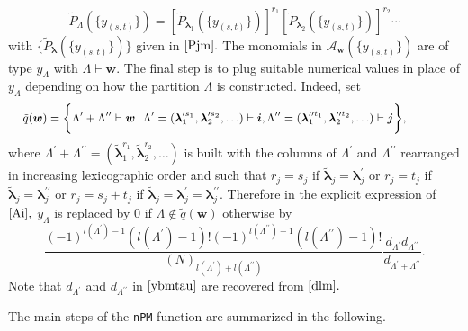 \[\tilde{P}_{\Lambda}\left( \{y_{(s,t)}\} \right)  = [\tilde{P}_{\boldsymbol{\lambda}_1}
\left( \{y_{(s,t)}\} \right) ]^{r_1} [\tilde{P}_{\boldsymbol{\lambda}_2}\left( \{y_{(s,t)}\} \right) ]^{r_2} 
\cdots\]
with \(\{\tilde{P}_{\boldsymbol{\lambda}}\left( \{y_{(s,t)}\} \right)\}\) given in \(\eqref{Pjm}.\)
The monomials in \({\mathcal A}_{\boldsymbol{w}}\left( \{y_{(s,t)}\} \right)\) are of type \(y_{\Lambda}\) with \(\Lambda \vdash \boldsymbol{w}.\) The final step is to plug suitable numerical values in place of \(y_{\Lambda}\) depending on how the partition \(\Lambda\) is constructed. Indeed, set
\begin{equation}\label{qw}
\hskip-1.3cm{\small \tilde{q}(\boldsymbol{w}) = \bigg\{  \Lambda^{\prime}+\Lambda^{\prime \prime} \vdash \boldsymbol{w} \, \big| \, \Lambda^{\prime}=(\boldsymbol{\lambda}_1^{\prime s_1}, \boldsymbol{\lambda}_2^{\prime s_2}, \ldots) \vdash \boldsymbol{i}, \Lambda^{\prime \prime} = (\boldsymbol{\lambda}_1^{\prime \prime t_1}, \boldsymbol{\lambda}_2^{\prime \prime t_2},\ldots) \vdash \boldsymbol{j} \bigg\}},\!\!\!
\end{equation}
where
\(\Lambda^{\prime}+\Lambda^{\prime \prime}=(\tilde{\boldsymbol{\lambda}}_1^{r_1}, \tilde{\boldsymbol{\lambda}}_2^{r_2}, \ldots)\) is built with the columns of
\(\Lambda^{\prime}\) and \(\Lambda^{\prime \prime}\) rearranged in increasing lexicographic order and such that \(r_j=s_j\) if \(\tilde{\boldsymbol{\lambda}}_j = \boldsymbol{\lambda}^{\prime}_j\) or \(r_j=t_j\) if \(\tilde{\boldsymbol{\lambda}}_j = \boldsymbol{\lambda}^{\prime \prime}_j\) or \(r_j=s_j+t_j\) if \(\tilde{\boldsymbol{\lambda}}_j = \boldsymbol{\lambda}^{\prime}_j = \boldsymbol{\lambda}^{\prime \prime}_j.\)
Therefore in the explicit expression of \(\eqref{Ai},\) \(y_{\Lambda}\) is replaced by \(0\) if \(\Lambda \not \in \tilde{q}(\boldsymbol{w})\) otherwise by
\begin{equation}\label{ybmtau}
\frac{{(-1)^{l(\Lambda^{\prime})-1}(l(\Lambda^{\prime})-1)!(-1)^{l(\Lambda^{\prime \prime})-1}(l(\Lambda^{\prime \prime})-1)!}}{(N)_{l(\Lambda^{\prime})+l(\Lambda^{\prime \prime})}} \frac{d_{\Lambda^{\prime}} d_{\Lambda^{\prime \prime}}}{d_{\Lambda^{\prime}+\Lambda^{\prime \prime}}}.
\end{equation}
Note that \(d_{\Lambda^{\prime}}\) and \(d_{\Lambda^{\prime \prime}}\) in \(\eqref{ybmtau}\) are recovered from \(\eqref{dlm}.\)

\hskip-0.5cm The main steps of the \texttt{nPM} function are summarized in the following.

\noindent

